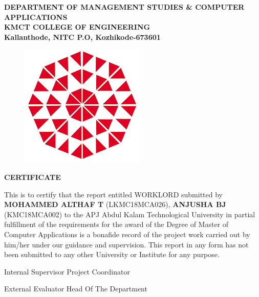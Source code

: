 \documentclass[a4paper,12pt]{report}
\begin{document}
\pagebreak

\begin{center}
	
\textbf{
\vspace*{8pt}
DEPARTMENT OF MANAGEMENT STUDIES \& COMPUTER
\vspace*{8pt}
APPLICATIONS\\
KMCT COLLEGE OF ENGINEERING\\
\vspace*{8pt}
Kallanthode, NITC P.O, Kozhikode-673601
}

\begin{figure}[bph]
	\centering
	\includegraphics[width=0.3023\linewidth]{kmct}
	\label{fig:ksblogo}
\end{figure}
\end{center}

{\centering \bf \large
	CERTIFICATE\par
}
\vspace*{10pt}
This is to certify that the report entitled WORKLORD submitted
by {\bf MOHAMMED ALTHAF T} (LKMC18MCA026), {\bf ANJUSHA BJ}
(KMC18MCA002) to the APJ Abdul Kalam Technological University
in partial fulfillment of the requirements for the award of the Degree of Master of Computer
Applications is a bonafide record of the project work carried out by him/her under our guidance and
supervision. This report in any form has not been submitted to any other University or Institute for
any purpose.

\begin{center}\vspace*{20pt}
	Internal Supervisor \hspace*{0pt} \hfill  Project Coordinator
\end{center}

\begin{center}\vspace*{40pt}
   External Evaluator \hspace*{0pt} \hfill  Head Of The Department
\end{center}
	
\pagebreak
\end{document}
